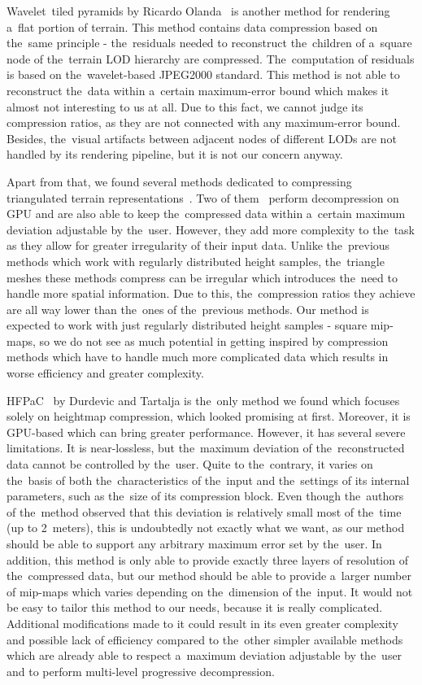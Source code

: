  Wavelet~tiled pyramids by Ricardo Olanda~\cite{jpeg2000terrain} is another method for rendering a~flat portion of terrain. This method contains data compression based on the~same principle - the~residuals needed to reconstruct the~children of a~square node of the~terrain LOD hierarchy are compressed. The~computation of residuals is based on the~wavelet-based JPEG2000 standard. This method is not able to reconstruct the~data within a~certain maximum-error bound which makes it almost not interesting to us at all. Due to this fact, we cannot judge its compression ratios, as they are not connected with any maximum-error bound. Besides, the~visual artifacts between adjacent nodes of different LODs are not handled by its rendering pipeline, but it is not our concern anyway.
 
 Apart from that, we found several methods dedicated to compressing triangulated terrain representations~\cite{meshesGPU1, meshesGPU2, meshes}. Two of them~\cite{meshesGPU1, meshesGPU2} perform decompression on GPU and are also able to keep the~compressed data within a~certain maximum deviation adjustable by the~user. However, they add more complexity to the~task as they allow for greater irregularity of their input data. Unlike the~previous methods which work with regularly distributed height samples, the~triangle meshes these methods compress can be irregular which introduces the~need to handle more spatial information. Due to this, the~compression ratios they achieve are all way lower than the~ones of the~previous methods. Our method is expected to work with just regularly distributed height samples - square mip-maps, so we do not see as much potential in getting inspired by compression methods which have to handle much more complicated data which results in worse efficiency and greater complexity.
 
 HFPaC~\cite{fieldGPU} by Durdevic and Tartalja is the~only method we found which focuses solely on heightmap compression, which looked promising at first. Moreover, it is GPU-based which can bring greater performance. However, it has several severe limitations. It is near-lossless, but the~maximum deviation of the~reconstructed data cannot be controlled by the~user. Quite to the~contrary, it varies on the~basis of both the~characteristics of the~input and the~settings of its internal parameters, such as the~size of its compression block. Even though the~authors of the~method observed that this deviation is relatively small most of the~time (up to 2~meters), this is undoubtedly not exactly what we want, as our method should be able to support any arbitrary maximum error set by the~user. In addition, this method is only able to provide exactly three layers of resolution of the~compressed data, but our method should be able to provide a~larger number of mip-maps which varies depending on the~dimension of the~input. It would not be easy to tailor this method to our needs, because it is really complicated. Additional modifications made to it could result in its even greater complexity and possible lack of efficiency compared to the~other simpler available methods which are already able to respect a~maximum deviation adjustable by the~user and to perform multi-level progressive decompression.
 
